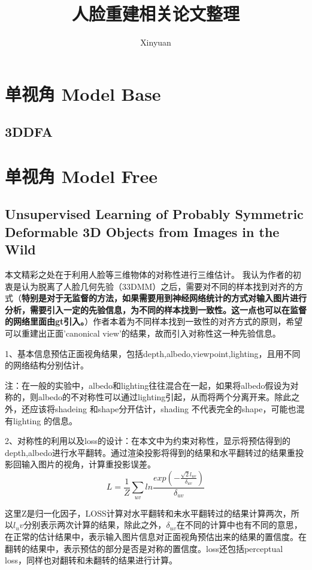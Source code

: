 \documentclass[UTF8,12pt]{article} %
\theoremstyle{definition}
\begin{document}
\title{人脸重建相关论文整理}
\author{Xinyuan}
\maketitle
\section{单视角 Model Base}
\subsection{3DDFA}
\section{单视角 Model Free}
\subsection{Unsupervised Learning of Probably Symmetric Deformable 3D Objects from Images in the Wild}
本文精彩之处在于利用人脸等三维物体的对称性进行三维估计。
我认为作者的初衷是认为脱离了人脸几何先验（33DMM）之后，需要对不同的样本找到对齐的方式（\textbf{特别是对于无监督的方法，如果需要用到神经网络统计的方式对输入图片进行分析，需要引入一定的先验信息，为不同的样本找到一致性。这一点也可以在监督的网络里面由gt引入。}）作者本着为不同样本找到一致性的对齐方式的原则，希望可以重建出正面'canonical view'的结果，故而引入对称性这一种先验信息。


1、基本信息预估正面视角结果，包括depth,albedo,viewpoint,lighting，且用不同的网络结构分别估计。

注：在一般的实验中，albedo和lighting往往混合在一起，如果将albedo假设为对称的，则albedo的不对称性可以通过lighting引起，从而将两个分离开来。除此之外，还应该将shadeing 和shape分开估计，shading 不代表完全的shape，可能也混有lighting 的信息。

2、对称性的利用以及loss的设计：在本文中为约束对称性，显示将预估得到的depth,albedo进行水平翻转。通过渲染投影将得到的结果和水平翻转过的结果重投影回输入图片的视角，计算重投影误差。
$$
L = \dfrac{1}{Z}\sum_{uv}ln\dfrac{exp(-\frac{\sqrt{2}l_{uv}}{\delta_{uv} })}{\delta_{uv}}
$$

这里Z是归一化因子，LOSS计算对水平翻转和未水平翻转过的结果计算两次，所以$l_uv$分别表示两次计算的结果，除此之外，$\delta_{uv}$在不同的计算中也有不同的意思，在正常的估计结果中，表示输入图片信息对正面视角预估出来的结果的置信度。在翻转的结果中，表示预估的部分是否是对称的置信度。loss还包括perceptual loss，同样也对翻转和未翻转的结果进行计算。
\end{document}
